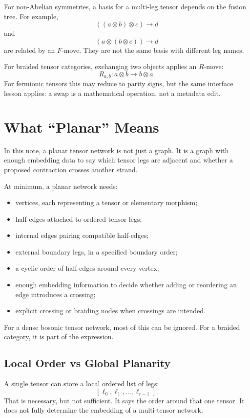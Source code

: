 \documentclass[11pt]{article}
\begin{document}
For non-Abelian symmetries, a basis for a multi-leg tensor depends on
the fusion tree.  For example,
\[
  ((a \otimes b) \otimes c) \to d
\]
and
\[
  (a \otimes (b \otimes c)) \to d
\]
are related by an \(F\)-move.  They are not the same basis with
different leg names.

For braided tensor categories, exchanging two objects applies an
\(R\)-move:
\[
  R_{a,b}: a \otimes b \to b \otimes a .
\]
For fermionic tensors this may reduce to parity signs, but the same
interface lesson applies: a swap is a mathematical operation, not a
metadata edit.

\section{What ``Planar'' Means}

In this note, a planar tensor network is not just a graph.  It is a
graph with enough embedding data to say which tensor legs are adjacent
and whether a proposed contraction crosses another strand.

At minimum, a planar network needs:

\begin{itemize}
  \item vertices, each representing a tensor or elementary morphism;
  \item half-edges attached to ordered tensor legs;
  \item internal edges pairing compatible half-edges;
  \item external boundary legs, in a specified boundary order;
  \item a cyclic order of half-edges around every vertex;
  \item enough embedding information to decide whether adding or
        reordering an edge introduces a crossing;
  \item explicit crossing or braiding nodes when crossings are intended.
\end{itemize}

For a dense bosonic tensor network, most of this can be ignored.  For a
braided category, it is part of the expression.

\subsection{Local Order vs Global Planarity}

A single tensor can store a local ordered list of legs:
\[
  [\ell_0,\ell_1,\ldots,\ell_{r-1}].
\]
That is necessary, but not sufficient.  It says the order around that
one tensor.  It does not fully determine the embedding of a multi-tensor
network.
\end{document}
